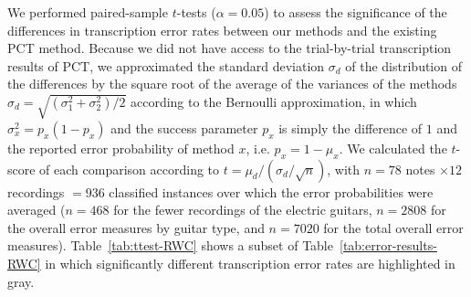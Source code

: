 \documentclass[convention,peer-reviewed]{aesconf}
\begin{document}
We performed paired-sample $t$-tests ($\alpha = 0.05$) to assess the significance of the differences in transcription error rates between our methods and the existing PCT method. Because we did not have access to the trial-by-trial transcription results of PCT, we approximated the standard deviation $\sigma_d$ of the distribution of the differences by the square root of the average of the variances of the methods $\sigma_d = \sqrt{(\sigma^2_1+\sigma^2_2)/2}$ according to the Bernoulli approximation, in which $\sigma_x^2 = p_x(1-p_x)$ and the success parameter $p_x$ is simply the difference of $1$ and the reported error probability of method $x$, i.e. $p_x = 1-\mu_x$. We calculated the $t$-score of each comparison according to $t = \mu_d/(\sigma_d/\sqrt{n})$, with $n= 78$ notes $\times 12$ recordings $=936$ classified instances over which the error probabilities were averaged ($n=468$ for the fewer recordings of the electric guitars, $n=2808$ for the overall error measures by guitar type, and $n=7020$ for the total overall error measures). Table~\ref{tab:ttest-RWC} shows a subset of Table~\ref{tab:error-results-RWC} in which significantly different transcription error rates are highlighted in gray.
\end{document}
